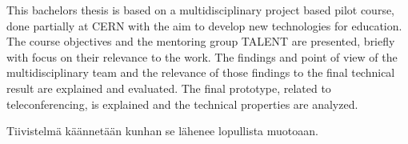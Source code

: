 \documentclass[english,12pt,a4paper,dvips]{article}
\begin{document}
%


\makecoverpage

\begin{abstractpage}[english]

 This bachelors thesis is based on a multidisciplinary project based pilot course, done partially at CERN with the aim to develop new technologies for education. The course objectives and the mentoring group TALENT are presented, briefly with focus on their relevance to the work. The findings and point of view of the multidisciplinary team and the relevance of those findings to the final technical result are explained and evaluated. The final prototype, related to teleconferencing, is explained and the technical properties are analyzed.
 
\end{abstractpage}


\begin{abstractpage}[finnish]
  
  Tiivistelmä käännetään kunhan se lähenee lopullista muotoaan.
  
  
\end{abstractpage}
\end{document}
